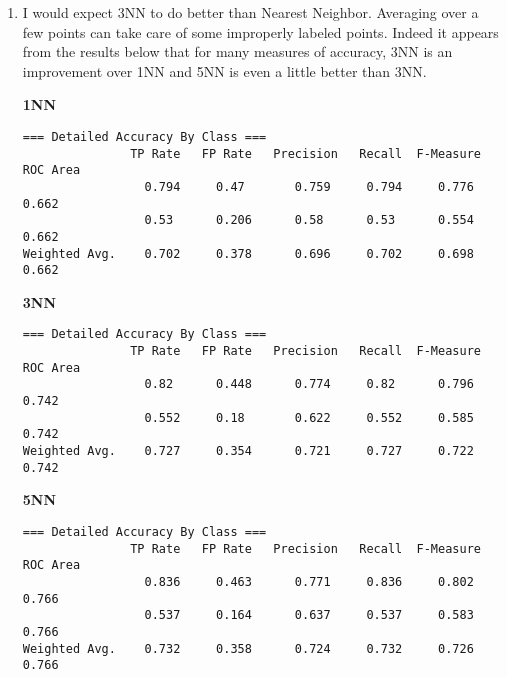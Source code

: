 \documentclass[12pt]{article}
\begin{document}
\begin{enumerate}
\begin{enumerate}
{\bf R=0.1}
\begin{verbatim}
                       Class
Variable     tested_negative
============================
preg                 -2.0877
plas                 -6.9767
pres                  1.6139
skin                 -0.0602
insu                  0.9985
mass                 -6.0008
pedi                 -2.2076
age                   -0.894
Intercept             7.9997
\end{verbatim}
{\bf R=0.0}
\begin{verbatim}
                       Class
Variable     tested_negative
============================
preg                 -2.0941
plas                 -6.9976
pres                  1.6221
skin                 -0.0613
insu                  1.0082
mass                 -6.0189
pedi                 -2.2136
age                  -0.8921
Intercept             8.0187
\end{verbatim}

\item %
I would expect 3NN to do better than Nearest Neighbor. Averaging over a few points can take care of some improperly labeled points. Indeed it appears from the results below that for many measures of accuracy, 3NN is an improvement over 1NN and 5NN is even a little better than 3NN.

{\bf 1NN}
\begin{verbatim}
=== Detailed Accuracy By Class ===
               TP Rate   FP Rate   Precision   Recall  F-Measure   ROC Area 
                 0.794     0.47       0.759     0.794     0.776      0.662  
                 0.53      0.206      0.58      0.53      0.554      0.662    
Weighted Avg.    0.702     0.378      0.696     0.702     0.698      0.662
\end{verbatim}

{\bf 3NN}
\begin{verbatim}
=== Detailed Accuracy By Class ===
               TP Rate   FP Rate   Precision   Recall  F-Measure   ROC Area 
                 0.82      0.448      0.774     0.82      0.796      0.742   
                 0.552     0.18       0.622     0.552     0.585      0.742   
Weighted Avg.    0.727     0.354      0.721     0.727     0.722      0.742
\end{verbatim}

{\bf 5NN}
\begin{verbatim}
=== Detailed Accuracy By Class ===
               TP Rate   FP Rate   Precision   Recall  F-Measure   ROC Area  
                 0.836     0.463      0.771     0.836     0.802      0.766    
                 0.537     0.164      0.637     0.537     0.583      0.766    
Weighted Avg.    0.732     0.358      0.724     0.732     0.726      0.766
\end{verbatim}


\end{enumerate}
\end{enumerate}
\end{document}
